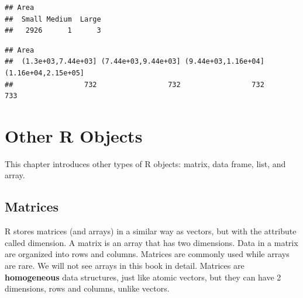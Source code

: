 \documentclass[
]{book}
\newenvironment{Shaded}{\begin{snugshade}}{\end{snugshade}}
\newcommand{\AttributeTok}[1]{\textcolor[rgb]{0.77,0.63,0.00}{#1}}
\newcommand{\CommentTok}[1]{\textcolor[rgb]{0.56,0.35,0.01}{\textit{#1}}}
\newcommand{\DecValTok}[1]{\textcolor[rgb]{0.00,0.00,0.81}{#1}}
\newcommand{\FloatTok}[1]{\textcolor[rgb]{0.00,0.00,0.81}{#1}}
\newcommand{\FunctionTok}[1]{\textcolor[rgb]{0.00,0.00,0.00}{#1}}
\newcommand{\NormalTok}[1]{#1}
\newcommand{\OtherTok}[1]{\textcolor[rgb]{0.56,0.35,0.01}{#1}}
\newcommand{\SpecialCharTok}[1]{\textcolor[rgb]{0.00,0.00,0.00}{#1}}
\newcommand{\StringTok}[1]{\textcolor[rgb]{0.31,0.60,0.02}{#1}}
\begin{document}
\begin{Shaded}
\end{Shaded}

\begin{verbatim}
## Area
##  Small Medium  Large 
##   2926      1      3
\end{verbatim}

\begin{Shaded}
\end{Shaded}

\begin{verbatim}
## Area
##  (1.3e+03,7.44e+03] (7.44e+03,9.44e+03] (9.44e+03,1.16e+04] (1.16e+04,2.15e+05] 
##                 732                 732                 732                 733
\end{verbatim}

\hypertarget{other-r-objects}{%
\chapter{Other R Objects}\label{other-r-objects}}

This chapter introduces other types of R objects: matrix, data frame, list, and array.

\hypertarget{matrices}{%
\section{Matrices}\label{matrices}}

R stores matrices (and arrays) in a similar way as vectors, but with the attribute called dimension. A matrix is an array that has two dimensions. Data in a matrix are organized into rows and columns. Matrices are commonly used while arrays are rare. We will not see arrays in this book in detail. Matrices are \textbf{homogeneous} data structures, just like atomic vectors, but they can have 2 dimensions, rows and columns, unlike vectors.
\end{document}
